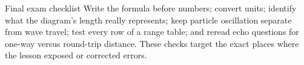 \documentclass[11pt,a4paper]{article}
\begin{document}
\begin{keybox}{Final exam checklist}
Write the formula before numbers; convert units; identify what the diagram's length really represents; keep particle oscillation separate from wave travel; test every row of a range table; and reread echo questions for one-way versus round-trip distance. These checks target the exact places where the lesson exposed or corrected errors.
\end{keybox}
\end{document}
